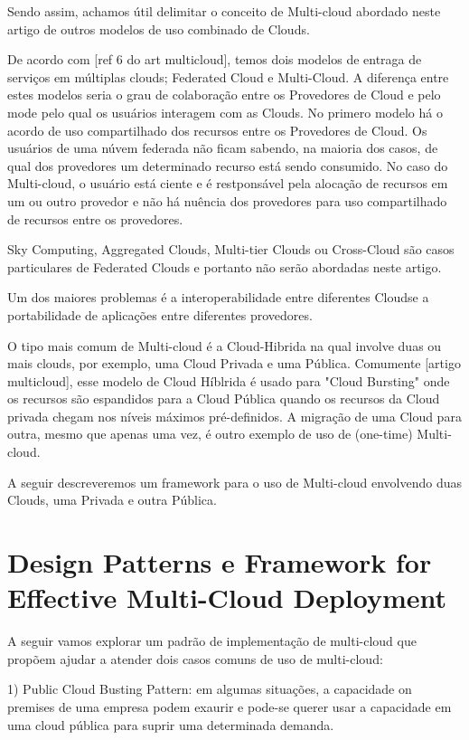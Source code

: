\documentclass[12pt]{article}
\begin{document}
	Sendo assim, achamos útil delimitar o conceito de Multi-cloud abordado neste artigo de outros modelos de uso combinado de Clouds.
	
	De acordo com [ref 6 do art multicloud], temos dois modelos de entraga de serviços em múltiplas clouds; Federated Cloud e Multi-Cloud. A diferença entre estes modelos seria o grau de colaboração entre os Provedores de Cloud e pelo mode pelo qual os usuários interagem com as Clouds. No primero modelo há o acordo de uso compartilhado dos recursos entre os Provedores de Cloud. Os usuários de uma núvem federada não ficam sabendo, na maioria dos casos, de qual dos provedores um determinado recurso está sendo consumido. No caso do Multi-cloud, o usuário está ciente e é restponsável pela alocação de recursos em um ou outro provedor e não há nuência dos provedores para uso compartilhado de recursos entre os provedores.
	
	Sky Computing, Aggregated Clouds, Multi-tier Clouds ou Cross-Cloud são casos particulares de Federated Clouds e portanto não serão abordadas neste artigo. 
	
	Um dos maiores problemas é a interoperabilidade entre diferentes Cloudse a portabilidade de aplicações entre diferentes provedores.
	
	O tipo mais comum de Multi-cloud é a Cloud-Hibrida na qual involve duas ou mais clouds, por exemplo, uma Cloud Privada e uma Pública. Comumente [artigo multicloud], esse modelo de Cloud Híblrida é usado para "Cloud Bursting" onde os recursos são espandidos para a Cloud Pública quando os recursos da Cloud privada chegam nos níveis máximos pré-definidos. A migração de uma Cloud para outra, mesmo que apenas uma vez, é outro exemplo de uso de (one-time) Multi-cloud.
	
	A seguir descreveremos um framework para o uso de Multi-cloud envolvendo duas Clouds, uma Privada e outra Pública. 
	
	\section{Design Patterns e Framework for Effective Multi-Cloud Deployment}
	
	A seguir vamos explorar um padrão de implementação de multi-cloud que propõem ajudar a atender dois casos comuns de uso de multi-cloud:
	
	1) Public Cloud Busting Pattern: em algumas situações, a capacidade on premises de uma empresa podem exaurir e pode-se querer usar a capacidade em uma cloud pública para suprir uma determinada demanda.
	
\end{document}
